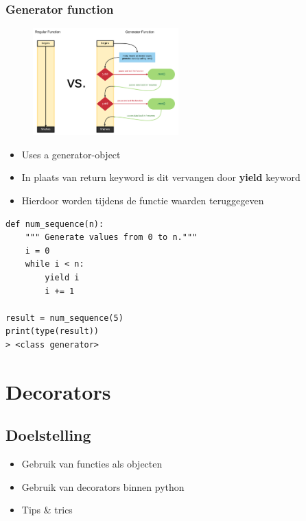 \documentclass{article}
\begin{document}
\subsubsection{Generator function}

\begin{figure}[H]
    \centering
    \includegraphics[width=0.5\textwidth]{generator-function.png}
\end{figure}

\begin{itemize}
    \item Uses a generator-object
    \item In plaats van return keyword is dit vervangen door \textbf{yield} keyword
    \item Hierdoor worden tijdens de functie waarden teruggegeven
\end{itemize}

\begin{verbatim}
def num_sequence(n):
    """ Generate values from 0 to n."""
    i = 0
    while i < n:
        yield i
        i += 1

result = num_sequence(5)
print(type(result))
> <class generator>
\end{verbatim}

\section{Decorators}

\subsection{Doelstelling}

\begin{itemize}
    \item Gebruik van functies als objecten
    \item Gebruik van decorators binnen python
    \item Tips \& trics
\end{itemize}
\end{document}
